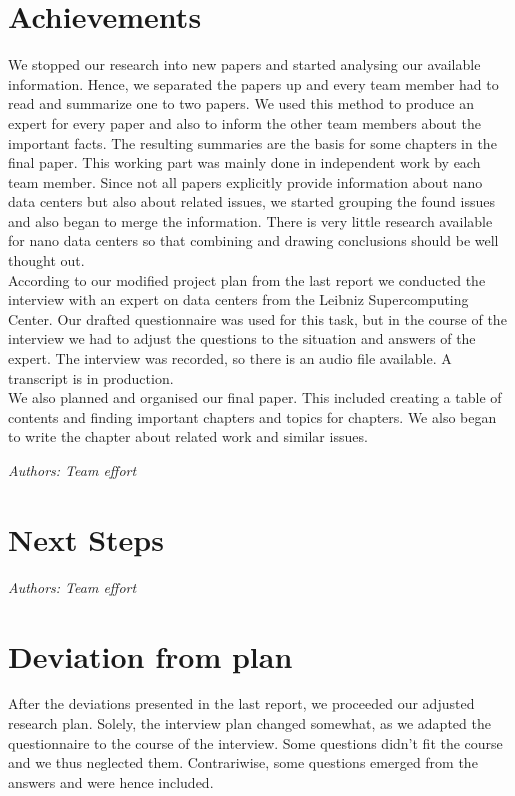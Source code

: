\documentclass[sigchi-a, authorversion]{acmart}
\begin{document}
\section{Achievements}
We stopped our research into new papers and started analysing our available information. Hence, we separated the papers up and every team member had to read and summarize one to two papers. We used this method to produce an expert for every paper and also to inform the other team members about the important facts. The resulting summaries are the basis for some chapters in the final paper. This working part was mainly done in independent work by each team member. Since not all papers explicitly provide information about nano data centers but also about related issues, we started grouping the found issues and also began to merge the information. There is very little research available for nano data centers so that combining and drawing conclusions should be well thought out.\\  
According to our modified project plan from the last report we conducted the interview with an expert on data centers from the Leibniz Supercomputing Center. Our drafted questionnaire was used for this task, but in the course of the interview we had to adjust the questions to the situation and answers of the expert. The interview was recorded, so there is an audio file available. A transcript is in production.\\
We also planned and organised our final paper. This included creating a table of contents and finding important chapters and topics for chapters. We also began to write the chapter about related work and similar issues.

\textit{Authors: Team effort}\\

\section{Next Steps}
\textit{Authors: Team effort}\\

\section{Deviation from plan}
After the deviations presented in the last report, we proceeded our adjusted research plan. Solely, the interview plan changed somewhat, as we adapted the questionnaire to the course of the interview. Some questions didn't fit the course and we thus neglected them. Contrariwise, some questions emerged from the answers and were hence included. 
\end{document}
